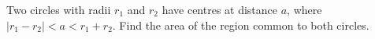 Two circles with radii $r_1$ and $r_2$ have centres at distance $a$, where $|r_1-r_2|<a<r_1+r_2$. Find the area of the region common to both circles.
